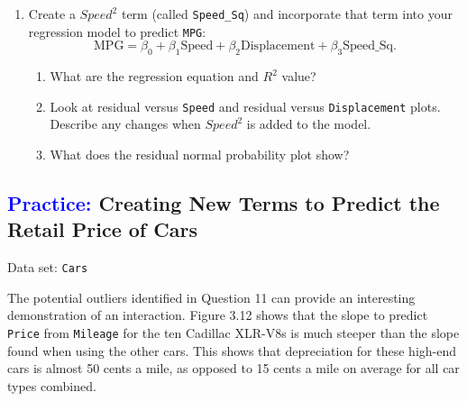 \documentclass[
]{report}
\begin{document}
\begin{enumerate}
  \item Create a $\scriptstyle {Speed}^2$ term (called \texttt{Speed\_Sq}) and incorporate that term into your regression model to predict \texttt{MPG}:  
  \[
  \mathrm{MPG} = \beta_0 + \beta_1 \mathrm{Speed} + \beta_2 \mathrm{Displacement} + \beta_3 \mathrm{Speed\_Sq}.
  \]
  \begin{enumerate}
    \item What are the regression equation and $\scriptstyle {R}^2$ value?
    \item Look at residual versus \texttt{Speed} and residual versus \texttt{Displacement} plots. Describe any changes when $\scriptstyle {Speed}^2$ is added to the model.
    \item What does the residual normal probability plot show?
  \end{enumerate}

\end{enumerate}

\hypertarget{creating-new-terms-to-predict-the-retail-price-of-cars}{%
\subsection*{\texorpdfstring{\textcolor{blue}{Practice:} Creating New Terms to Predict the Retail Price of Cars}{ Creating New Terms to Predict the Retail Price of Cars}}\label{creating-new-terms-to-predict-the-retail-price-of-cars}}

\vspace{-1em}

Data set: \texttt{Cars}

The potential outliers identified in Question 11 can provide an interesting demonstration of an interaction. Figure 3.12 shows that the slope to predict \texttt{Price} from \texttt{Mileage} for the ten Cadillac XLR-V8s is much steeper than the slope found when using the other cars. This shows that depreciation for these high-end cars is almost 50 cents a mile, as opposed to 15 cents a mile on average for all car types combined.
\end{document}
